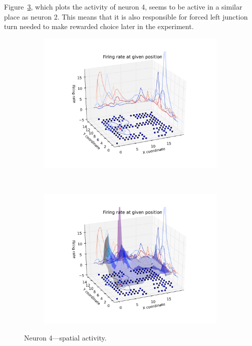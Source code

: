 \documentclass[11pt,a4paper,twocolumn]{article}
\begin{document}
Figure~\ref{fig:3d_n4}, which plots the activity of neuron 4, seems to be active in a similar place as neuron 2. This means that it is also responsible for forced left junction turn needed to make rewarded choice later in the experiment.\\

\begin{figure}[htbp]
  \begin{subfigure}{.99\linewidth}\centering
    \includegraphics[width=1.1\textwidth]{figure9_a.png}
    \caption{\label{fig:3d_n4_a}}
  \end{subfigure}\\[1ex]
  \begin{subfigure}{.99\linewidth}\centering
    \includegraphics[width=1.1\textwidth]{figure9_b.png}
    \caption{\label{fig:3d_n4_b}}
  \end{subfigure}

  \caption{Neuron 4---spatial activity.\label{fig:3d_n4}}
\end{figure}
\end{document}
